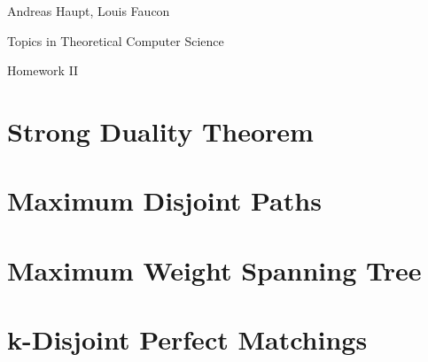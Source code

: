 \documentclass{scrartcl}
\newcommand\1{\mathbf{1}}
\begin{document}
Andreas Haupt, Louis Faucon

Topics in Theoretical Computer Science 

Homework II

\section{Strong Duality Theorem}

\section{Maximum Disjoint Paths}

\section{Maximum Weight Spanning Tree}

\section{k-Disjoint Perfect Matchings}
\end{document}
